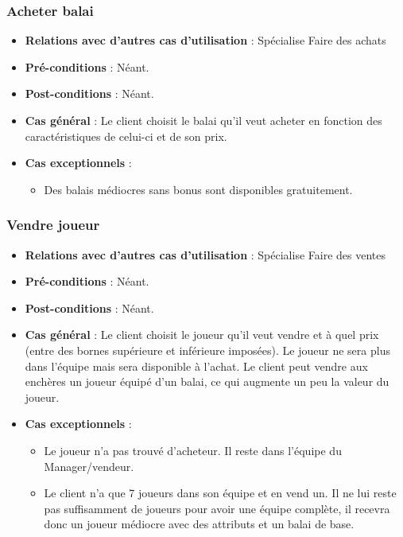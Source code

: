 \documentclass[a4paper,titlepage]{scrreprt}
\begin{document}
    \subsubsection{Acheter balai}
      \begin{itemize}
        \item \textbf{Relations avec d'autres cas d'utilisation}  : Spécialise Faire des achats
        \item \textbf{Pré-conditions} : Néant.
        \item \textbf{Post-conditions} : Néant.
        \item \textbf{Cas général} : Le client choisit le balai qu’il veut acheter en fonction des caractéristiques de celui-ci et de son prix. 
        \item \textbf{Cas exceptionnels} :
          \begin{itemize}
            \item Des balais médiocres sans bonus sont disponibles gratuitement.
          \end{itemize}
      \end{itemize}
    \subsubsection{Vendre joueur}
      \begin{itemize}
        \item \textbf{Relations avec d'autres cas d'utilisation}  : Spécialise Faire des ventes
        \item \textbf{Pré-conditions} : Néant.
        \item \textbf{Post-conditions} : Néant.
        \item \textbf{Cas général} : Le client choisit le joueur qu’il veut vendre et à quel prix (entre des bornes supérieure et inférieure imposées). Le joueur ne sera plus dans l’équipe mais sera disponible à l’achat. Le client peut vendre aux enchères un joueur équipé d’un balai, ce qui augmente un peu la valeur du joueur.
        \item \textbf{Cas exceptionnels} : 
        \begin{itemize}
            \item Le joueur n'a pas trouvé d'acheteur. Il reste dans l'équipe du Manager/vendeur.
            \item Le client n’a que 7 joueurs dans son équipe et en vend un. Il ne lui reste pas suffisamment de joueurs pour avoir une équipe complète, il recevra donc un joueur médiocre avec des attributs et un balai de base.
          \end{itemize}
      \end{itemize}
\end{document}
